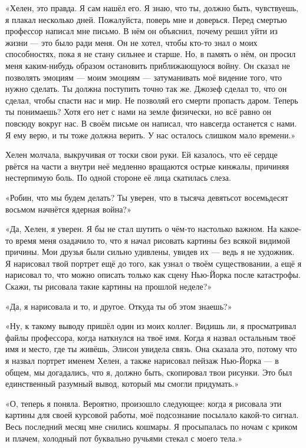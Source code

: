\documentclass[a5paper, 9pt,
final, openany, twoside=true]{memoir}
\begin{document}
«Хелен, это правда. Я сам нашёл его. Я знаю, что ты, должно быть, чувствуешь, я плакал несколько дней. Пожалуйста, поверь мне и доверься. Перед смертью профессор написал мне письмо. В нём он объяснил, почему решил уйти из жизни — это было ради меня. Он не хотел, чтобы кто-то знал о моих способностях, пока я не стану сильнее и старше. Но, в память о нём, он просил меня каким-нибудь образом остановить приближающуюся войну. Он сказал не позволять эмоциям — моим эмоциям — затуманивать моё видение того, что нужно сделать. Ты должна поступить точно так же. Джозеф сделал то, что он сделал, чтобы спасти нас и мир. Не позволяй его смерти пропасть даром. Теперь ты понимаешь? Хотя его нет с нами на земле физически, но всё равно он повсюду вокруг нас. В своём письме он написал, что навсегда останется с нами. Я ему верю, и ты тоже должна верить. У нас осталось слишком мало времени.»

Хелен молчала, выкручивая от тоски свои руки. Ей казалось, что её сердце рвётся на части а внутри неё медленно вращаются острые кинжалы, причиняя нестерпимую боль. По одной стороне её лица скатилась слеза.

«Робин, что мы будем делать? Ты уверен, что в тысяча девятьсот восемьдесят восьмом начнётся ядерная война?»

«Да, Хелен, я уверен. Я бы не стал шутить о чём-то настолько важном. На какое-то время меня озадачило то, что я начал рисовать картины без всякой видимой причины. Мои друзья были сильно удивлены, увидев их — ведь я не художник. Я нарисовал твой портрет ещё до того, как узнал о твоём существовании, а ещё я нарисовал то, что можно описать только как сцену Нью-Йорка после катастрофы. Скажи, ты рисовала такие картины на прошлой неделе?»

«Да, я нарисовала и то, и другое. Откуда ты об этом знаешь?»

«Ну, к такому выводу пришёл один из моих коллег. Видишь ли, я просматривал файлы профессора, когда наткнулся на твоё имя. Когда я назвал остальным твоё имя и место, где ты живёшь, Элисон увидела связь. Она сказала это, потому что я назвал портрет именем Хелен, а также нарисовал пейзаж Нью-Йорка — в общем, мы догадались, что я, должно быть, скопировал твои рисунки. Это был единственный разумный вывод, который мы смогли придумать.»

«О, теперь я поняла. Вероятно, произошло следующее: когда я рисовала эти картины для своей курсовой работы, моё подсознание посылало какой-то сигнал. Весь последний месяц мне снились кошмары. Я просыпалась по ночам с криком и плачем, холодный пот буквально ручьями стекал с моего тела.»
\end{document}
